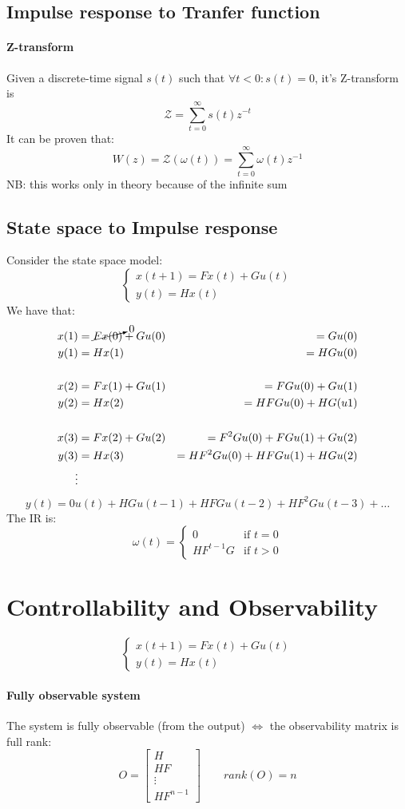 \documentclass{report}
\begin{document}
\subsection{Impulse response to Tranfer function}
\paragraph{Z-transform} Given a discrete-time signal $s(t)$ such that $\forall t<0:s(t)=0$, it's Z-transform is
\[
\mathcal{Z}=\sum_{t=0}^\infty s(t)z^{-t}
\]
It can be proven that:
\[
W(z)=\mathcal{Z}(\omega(t))=\sum_{t=0}^\infty \omega(t)z^{-1}
\]
NB: this works only in theory because of the infinite sum

\subsection{State space to Impulse response}
Consider the state space model:
\[
\begin{cases}
x(t+1)=Fx(t)+Gu(t)\\
y(t)=Hx(t)
\end{cases}
\]
We have that:
\begin{align*}
x(1)&=\cancelto{0}{Fx(0)}+Gu(0)&=Gu(0)\\
y(1)&=Hx(1)&=HGu(0)\\
\\
x(2)&=Fx(1)+Gu(1)&=FGu(0)+Gu(1)\\
y(2)&=Hx(2)&=HFGu(0)+HG(u1)\\
\\
x(3)&=Fx(2)+Gu(2)&=F^2Gu(0)+FGu(1)+Gu(2)\\
y(3)&=Hx(3)&=HF^2Gu(0)+HFGu(1)+HGu(2)\\
\vdots
\end{align*}
\[
y(t)=0u(t)+HGu(t-1)+HFGu(t-2)+HF^2Gu(t-3)+\dots
\]
The IR is:
\[
\omega(t)=
\begin{cases}
0 & \text{if } t=0\\
HF^{t-1}G & \text{if } t>0
\end{cases}
\]


\section{Controllability and Observability}
\[
\begin{cases}
x(t+1)=Fx(t)+Gu(t)\\
y(t)=Hx(t)
\end{cases}
\]
\paragraph{Fully observable system} The system is fully observable (from the output) $\iff$ the observability matrix is full rank:
\[
O=\begin{bmatrix}
H\\HF\\\vdots\\HF^{n-1}
\end{bmatrix}
\qquad
rank(O)=n
\]
\end{document}
